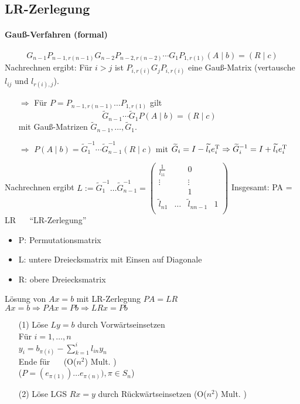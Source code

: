 \subsection{LR-Zerlegung}

\paragraph{Gauß-Verfahren (formal)}
$$G_{n-1} P_{n-1,r(n-1)}G_{n-2}P_{n-2,r(n-2)} \cdots G_1P_{1,r(1)}(A \mid b) = (R \mid c)$$
Nachrechnen ergibt: Für $i>j$ ist $P_{i,r(i)} G_jP_{i,r(i)}$ eine Gauß-Matrix
(vertausche $l_{ij}$ und $l_{r(i),j}$).

\begin{itemize}
\item[$\Rightarrow$] Für $P = P_{n-1,r(n-1)} \dots P_{1,r(1)}$ gilt 
    $$\widetilde{G}_{n-1} \cdots \widetilde{G}_1 P (A \mid b) = (R \mid c)$$
    mit Gauß-Matrizen $\widetilde{G}_{n-1}, \dots, \widetilde{G}_1$.

\item[$\Rightarrow$] $P (A \mid b) = 
    \widetilde{G}_1^{-1} \cdots \widetilde{G}_{n-1}^{-1} (R \mid c)$
    mit $\widetilde{G}_i = I - \widetilde{l_i} e_i^\mathrm T 
         \Rightarrow \widetilde{G}_i^{-1} = I + \widetilde{l_i} e_i^\mathrm T$
\end{itemize}

Nachrechnen ergibt
$L := \widetilde{G}_1^{-1} \dots \widetilde{G}_{n-1}^{-1} = 
\begin{pmatrix} 
\frac{1}{l_{11}} & & 0 \\ 
\vdots & & \vdots \\ 
& & 1 & \\
\widetilde{l}_{n1} & \dots & \widetilde{l}_{nn-1} & 1 \\ 
\end{pmatrix}$
Insgesamt: PA = LR ~~ "`LR-Zerlegung"'
\begin{itemize}
\item P: Permutationsmatrix
\item L: untere Dreiecksmatrix mit Einsen auf Diagonale
\item R: obere Dreiecksmatrix
\end{itemize}

Lösung von $Ax = b$ mit LR-Zerlegung $PA=LR$ \\
$Ax=b \Rightarrow PAx = Pb \Rightarrow LRx = Pb$
\begin{enumerate}
\item[(1)]
Löse $Ly = b$ durch Vorwärtseinsetzen \\
Für $i = 1, \dots ,n$ \\
$y_i = b_{\pi(i)} - \sum_{k = 1}^{i} l_{in} y_n $\\
Ende für  ~~ (O($n^2$) Mult. )\\
($P = (e_{\pi(1)}) \dots e_{\pi(n)}), \pi \in S_n$) 
\item[(2)]
Löse LGS $Rx = y$ durch Rückwärtseinsetzen (O($n^2$) Mult. )
\end{enumerate}


